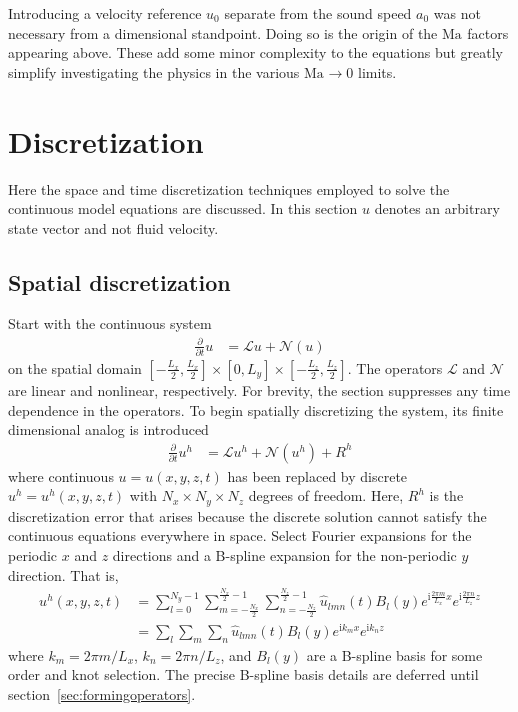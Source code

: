 \documentclass[letterpaper,11pt,nointlimits,reqno,draft]{amsbook}
\newcommand{\ii}{\ensuremath{\mathrm{i}}}
\newcommand{\Mach}[1][]{\ensuremath{\mbox{Ma}_{#1}}}
\begin{document}
Introducing a velocity reference $u_{0}$ separate from the sound speed $a_{0}$
was not necessary from a dimensional standpoint.  Doing so is the origin of the
$\Mach$ factors appearing above.  These add some minor complexity to the
equations but greatly simplify investigating the physics in the various
$\Mach\to{}0$ limits.

\chapter{Discretization}
\label{sec:discretization}

Here the space and time discretization techniques employed to solve the
continuous model equations are discussed.  In this section $u$ denotes an
arbitrary state vector and not fluid velocity.

\section{Spatial discretization}
\label{sec:spatialdiscretization}

Start with the continuous system
\begin{align}
  \frac{\partial}{\partial{}t} u &= \mathscr{L}u + \mathscr{N}\!\left(u\right)
\end{align}
on the spatial domain $\left[-\frac{L_x}{2},\frac{L_x}{2}\right] \times{}
[0,L_y] \times{} \left[-\frac{L_z}{2},\frac{L_z}{2}\right]$.  The operators
$\mathscr{L}$ and $\mathscr{N}$ are linear and nonlinear, respectively.  For
brevity, the section suppresses any time dependence in the operators.  To begin
spatially discretizing the system, its finite dimensional analog is introduced
\begin{align}
  \frac{\partial}{\partial{}t} u^h
  &=
  \mathscr{L}u^h + \mathscr{N}\!\left(u^h\right) + R^h
  \label{eq:discrete_system_with_residual}
\end{align}
where continuous $u = u\!\left(x,y,z,t\right)$ has been replaced by discrete
$u^h = u^h\!\left(x,y,z,t\right)$ with $N_x\times{}N_y\times{}N_z$ degrees of
freedom.  Here, $R^h$ is the discretization error that arises because the
discrete solution cannot satisfy the continuous equations everywhere in space.
Select Fourier expansions for the periodic $x$ and $z$ directions and a
B-spline expansion for the non-periodic $y$ direction.  That is,
\begin{align}
u^h(x,y,z,t)
&=
  \sum_{l=0}^{N_y - 1}
  \sum_{m=-\frac{N_x}{2}}^{\frac{N_x}{2}-1}
  \sum_{n=-\frac{N_z}{2}}^{\frac{N_z}{2}-1}
  \hat{u}_{l m n}(t)
  B_l\!\left(y\right)
  e^{\ii\frac{2\pi{}m}{L_x}x}
  e^{\ii\frac{2\pi{}n}{L_z}z}
  \\
&=
  \sum_{l}\sum_{m}\sum_{n}
  \hat{u}_{l m n}(t)B_l\!\left(y\right)e^{\ii k_m x}e^{\ii k_n z}
  \label{eq:u_h_expansion}
\end{align}
where $k_m = 2\pi{}m/L_x$, $k_n = 2\pi{}n/L_z$, and $B_l\!\left(y\right)$ are a
B-spline basis for some order and knot selection.  The precise B-spline basis
details are deferred until section~\ref{sec:formingoperators}.
\end{document}
